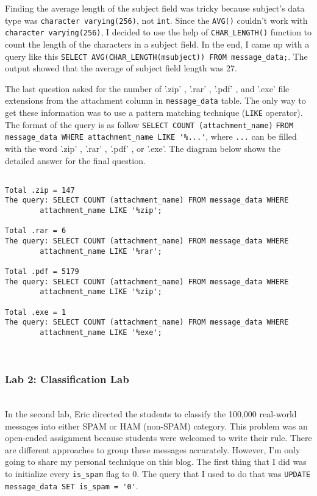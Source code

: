\documentclass[letterpaper,10pt,titlepage,draftclsnofoot,onecolumn]{IEEEtran}
\begin{document}
Finding the average length of the subject field was tricky because subject's data type was \verb|character varying(256)|, not \verb|int|. Since the \verb|AVG()| couldn't work with \verb|character varying(256)|, I decided to use the help of \verb|CHAR_LENGTH()| function to count the length of the characters in a subject field.
In the end, I came up with a query like this \verb|SELECT AVG(CHAR_LENGTH(msubject)) FROM message_data;|.
The output showed that the average of subject field length was 27.

The last question asked for the number of '.zip' , '.rar' , '.pdf' , and '.exe' file extensions from the attachment column in \verb|message_data| table.
The only way to get these information was to use a pattern matching technique (\verb|LIKE| operator).
The format of the query is as follow \verb|SELECT COUNT (attachment_name)| \verb|FROM message_data WHERE attachment_name LIKE '%...'|, where \verb|...| can be filled with the word '.zip' , '.rar' , '.pdf' , or '.exe'.
The diagram below shows the detailed answer for the final question.
\begin{lstlisting}

Total .zip = 147 
The query: SELECT COUNT (attachment_name) FROM message_data WHERE 
		attachment_name LIKE '%zip';

Total .rar = 6 
The query: SELECT COUNT (attachment_name) FROM message_data WHERE 
		attachment_name LIKE '%rar';

Total .pdf = 5179	
The query: SELECT COUNT (attachment_name) FROM message_data WHERE 
		attachment_name LIKE '%zip';

Total .exe = 1 
The query: SELECT COUNT (attachment_name) FROM message_data WHERE 
		attachment_name LIKE '%exe';

\end{lstlisting}

\hfill\\
\subsubsection{Lab 2: Classification Lab}
\hfill\\
In the second lab, Eric directed the students to classify the 100,000 real-world messages into either SPAM or HAM (non-SPAM) category. 
This problem was an open-ended assignment because students were welcomed to write their rule. 
There are different approaches to group these messages accurately. However, I'm only going to share my personal technique on this blog.
The first thing that I did was to initialize every \verb|is_spam| flag to 0. 
The query that I used to do that was \verb|UPDATE message_data SET is_spam = '0'|.
\end{document}
